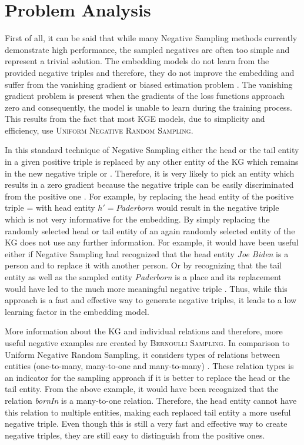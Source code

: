 \section{Problem Analysis}

First of all, it can be said that while many Negative Sampling methods currently demonstrate high performance, the sampled negatives are often too simple and represent a trivial solution. 
The embedding models do not learn from the provided negative triples and therefore, they do not improve the embedding and suffer from the vanishing gradient or biased estimation problem \cite{zhang2021efficient}.
The vanishing gradient problem is present when the gradients of the loss functions approach zero and consequently, the model is unable to learn during the training process.
This results from the fact that most \ac{KGE} models, due to simplicity and efficiency, use \textsc{Uniform Negative Random Sampling}.

In this standard technique of Negative Sampling either the head or the tail entity in a given positive triple  is replaced by any other entity of the \ac{KG} which remains in the new negative triple  or . 
Therefore, it is very likely to pick an entity which results in a zero gradient because the negative triple can be easily discriminated from the positive one \cite{cai2017kbgan}.
For example, by replacing the head entity of the positive triple  =  with head entity $h' = Paderborn$ would result in the negative triple  which is not very informative for the embedding.
By simply replacing the randomly selected head or tail entity of an again randomly selected entity of the \ac{KG} does not use any further information.
For example, it would have been useful either if Negative Sampling had recognized that the head entity \textit{Joe Biden} is a person and to replace it with another person.
Or by recognizing that the tail entity as well as the sampled entity \textit{Paderborn} is a place and its replacement would have led to the much more meaningful negative triple .  
Thus, while this approach is a fast and effective way to generate negative triples, it leads to a low learning factor in the embedding model.

More information about the \ac{KG} and individual relations and therefore, more useful negative examples are created by \textsc{Bernoulli Sampling}.
In comparison to Uniform Negative Random Sampling, it considers types of relations between entities (one-to-many, many-to-one and many-to-many) \cite{zhang2021efficient}.
These relation types is an indicator for the sampling approach if it is better to replace the head or the tail entity.
From the above example, it would have been recognized that the relation \textit{bornIn} is a many-to-one relation.
Therefore, the head entity cannot have this relation to multiple entities, making each replaced tail entity a more useful negative triple.
Even though this is still a very fast and effective way to create negative triples, they are still easy to distinguish from the positive ones.

